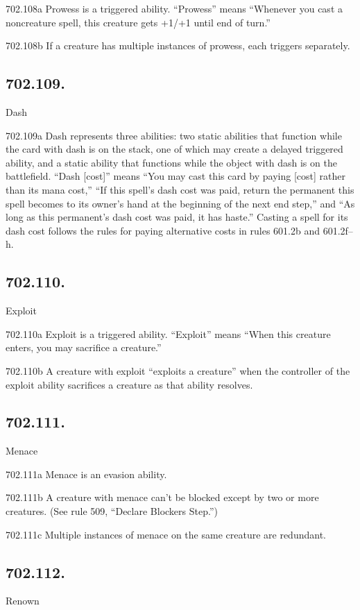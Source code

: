 702.108a Prowess is a triggered ability. “Prowess” means “Whenever you cast a noncreature spell, this creature gets +1/+1 until end of turn.”

702.108b If a creature has multiple instances of prowess, each triggers separately.

\subsection*{702.109.}
Dash

702.109a Dash represents three abilities: two static abilities that function while the card with dash is on the stack, one of which may create a delayed triggered ability, and a static ability that functions while the object with dash is on the battlefield. “Dash [cost]” means “You may cast this card by paying [cost] rather than its mana cost,” “If this spell’s dash cost was paid, return the permanent this spell becomes to its owner’s hand at the beginning of the next end step,” and “As long as this permanent’s dash cost was paid, it has haste.” Casting a spell for its dash cost follows the rules for paying alternative costs in rules 601.2b and 601.2f–h.

\subsection*{702.110.}
Exploit

702.110a Exploit is a triggered ability. “Exploit” means “When this creature enters, you may sacrifice a creature.”

702.110b A creature with exploit “exploits a creature” when the controller of the exploit ability sacrifices a creature as that ability resolves.

\subsection*{702.111.}
Menace

702.111a Menace is an evasion ability.

702.111b A creature with menace can’t be blocked except by two or more creatures. (See rule 509, “Declare Blockers Step.”)

702.111c Multiple instances of menace on the same creature are redundant.

\subsection*{702.112.}
Renown


